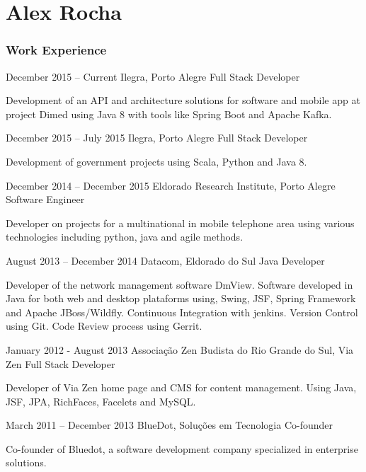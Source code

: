 \documentclass{tccv}
\begin{document}
\part{Alex Rocha}

\section{Work Experience}

\begin{eventlist}

\item{December 2015 -- Current}
    {Ilegra, Porto Alegre}
    {Full Stack Developer}

    Development of an API and architecture solutions for software and mobile app at project Dimed using Java 8 with tools like Spring Boot and Apache Kafka.

\item{December 2015 -- July 2015}
    {Ilegra, Porto Alegre}
    {Full Stack Developer}

    Development of government projects using Scala, Python and Java 8.

\item{December 2014 -- December 2015}
    {Eldorado Research Institute, Porto Alegre}
    {Software Engineer}

    Developer on projects for a multinational in mobile telephone area using various technologies including python, java and agile methods.

\item{August 2013 -- December 2014}
    {Datacom, Eldorado do Sul}
    {Java Developer}

    Developer of the network management software DmView.
    Software developed in Java for both web and desktop plataforms using, Swing, JSF, Spring Framework and Apache JBoss/Wildfly.
    Continuous Integration with jenkins. Version Control using Git. Code Review process using
    Gerrit.

\item{January 2012 - August 2013}
    {Associação Zen Budista do Rio Grande do Sul, Via Zen}
    {Full Stack Developer}

    Developer of Via Zen home page and CMS for content management. Using Java, JSF, JPA, RichFaces, Facelets and MySQL.

\item{March 2011 -- December 2013}
    {BlueDot, Soluções em Tecnologia}
    {Co-founder}

    Co-founder of Bluedot, a software development company specialized in enterprise solutions.


\end{eventlist}
\end{document}
